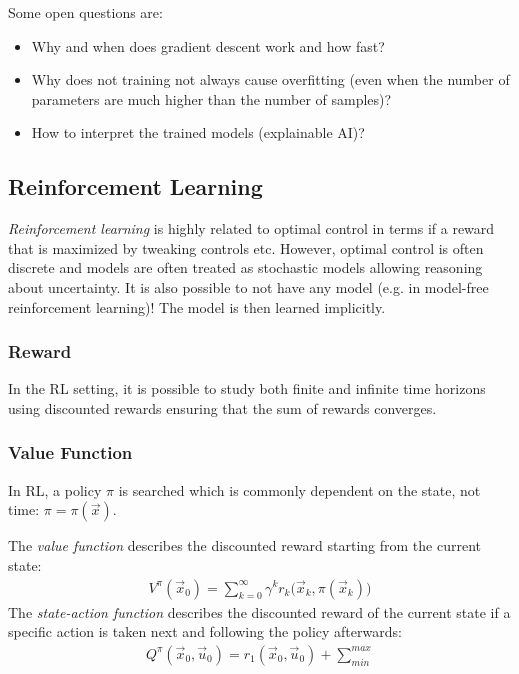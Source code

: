 			Some open questions are:
			\begin{itemize}
				\item Why and when does gradient descent work and how fast?
				\item Why does not training not always cause overfitting (even when the number of parameters are much higher than the number of samples)?
				\item How to interpret the trained models (explainable AI)?
			\end{itemize}

		\subsection{Reinforcement Learning}
			\emph{Reinforcement learning} is highly related to optimal control in terms if a reward that is maximized by tweaking controls etc. However, optimal control is often discrete and models are often treated as stochastic models allowing reasoning about uncertainty. It is also possible to not have any model (e.g. in model-free reinforcement learning)! The model is then learned implicitly.

			\subsubsection{Reward}
				In the RL setting, it is possible to study both finite and infinite time horizons using discounted rewards ensuring that the sum of rewards converges.

			\subsubsection{Value Function}
				In RL, a policy \( \pi \) is searched which is commonly dependent on the state, not time: \( \pi = \pi(\vec{x}) \).

				The \emph{value function} describes the discounted reward starting from the current state:
				\begin{align*}
					V^\pi(\vec{x}_0) = \sum_{k = 0}^{\infty} \gamma^k r_k\big(\vec{x}_k, \pi(\vec{x}_k)\big)
				\end{align*}
				The \emph{state-action function} describes the discounted reward of the current state if a specific action is taken next and following the policy afterwards:
				\begin{align*}
					Q^\pi(\vec{x}_0, \vec{u}_0) = r_1(\vec{x}_0, \vec{u}_0) + \sum_{min}^{max}
				\end{align*}

